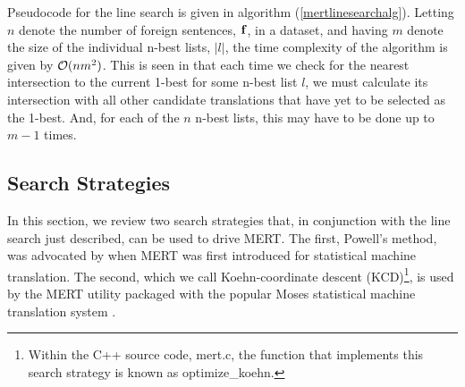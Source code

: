 \documentclass[11pt]{article}
\begin{document}
Pseudocode for the line search is given in algorithm (\ref{mertlinesearchalg}). Letting $n$ denote the number of foreign sentences, ${\bf f}$, in a dataset, and having $m$ denote the size of the individual n-best lists, $|l|$, the time complexity of the algorithm is given by ${\cal O}(n m^2)$. This is seen in that each time we check for the nearest intersection to the current 1-best for some n-best list $l$, we must calculate its intersection with all other candidate translations that have yet to be selected as the 1-best. And, for each of the $n$ n-best lists, this may have to be done up to $m-1$ times. 

    
\subsection{Search Strategies}

In this section, we review two search strategies that, in conjunction with the line search just described, can be used to drive MERT. The first, Powell's method, was advocated by  when MERT was first introduced for statistical machine translation. The second, which we call Koehn-coordinate descent (KCD)\footnote{Within the C++ source code, mert.c, the function that implements this search strategy is known as optimize\_koehn.}, is used by the MERT utility packaged with the popular Moses statistical machine translation system \cite{koehn2007}. 
\end{document}
